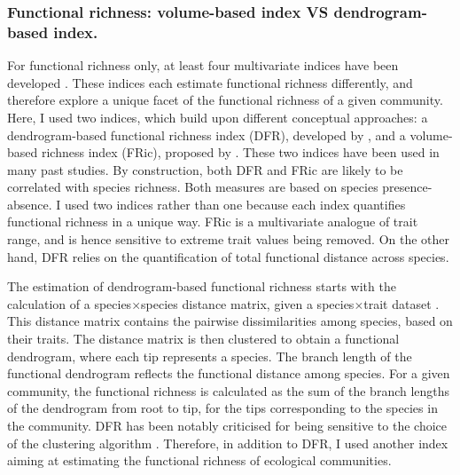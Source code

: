 \subsubsection{Functional richness: volume-based index VS dendrogram-based index.}
For functional richness only, at least four multivariate indices have been developed \citep{Legras2018}. These indices each estimate functional richness differently, and therefore explore a unique facet of the functional richness of a given community. Here, I used two indices, which build upon different conceptual approaches: a dendrogram-based functional richness index (DFR), developed by \citet{Petchey2002}, and a volume-based richness index (FRic), proposed by \citet{Villeger2008}. These two indices have been used in many past studies. By construction, both DFR and FRic are likely to be correlated with species richness. Both measures are based on species presence-absence. I used two indices rather than one because each index quantifies functional richness in a unique way. FRic is a multivariate analogue of trait range, and is hence sensitive to extreme trait values being removed. On the other hand, DFR relies on the quantification of total functional distance across species. 

The estimation of dendrogram-based functional richness starts with the calculation of a species$\times$species distance matrix, given a species$\times$trait dataset \citep{Petchey2002}. This distance matrix contains the pairwise dissimilarities among species, based on their traits. The distance matrix is then clustered to obtain a functional dendrogram, where each tip represents a species. The branch length of the functional dendrogram reflects the functional distance among species. For a given community, the functional richness is calculated as the sum of the branch lengths of the dendrogram from root to tip, for the tips corresponding to the species in the community. DFR has been notably criticised for being sensitive to the choice of the clustering algorithm \citep{Legras2018}. Therefore, in addition to DFR, I used another index aiming at estimating the functional richness of ecological communities. 


